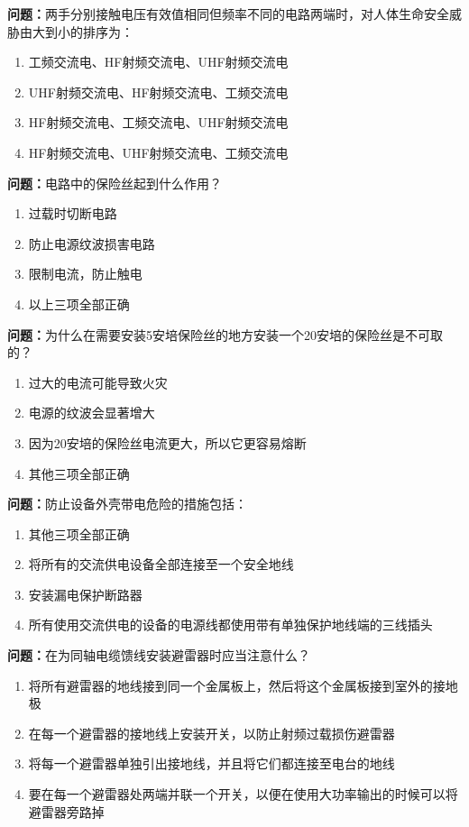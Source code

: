 \documentclass{ctexbook}
\begin{document}
\textbf{问题：}两手分别接触电压有效值相同但频率不同的电路两端时，对人体生命安全威胁由大到小的排序为：
\begin{enumerate}[label=\Alph*), leftmargin=3em]
\item 工频交流电、HF射频交流电、UHF射频交流电
\item UHF射频交流电、HF射频交流电、工频交流电
\item HF射频交流电、工频交流电、UHF射频交流电
\item HF射频交流电、UHF射频交流电、工频交流电
\end{enumerate}

\textbf{问题：}电路中的保险丝起到什么作用？
\begin{enumerate}[label=\Alph*), leftmargin=3em]
\item 过载时切断电路
\item 防止电源纹波损害电路
\item 限制电流，防止触电
\item 以上三项全部正确
\end{enumerate}

\textbf{问题：}为什么在需要安装5安培保险丝的地方安装一个20安培的保险丝是不可取的？
\begin{enumerate}[label=\Alph*), leftmargin=3em]
\item 过大的电流可能导致火灾
\item 电源的纹波会显著增大
\item 因为20安培的保险丝电流更大，所以它更容易熔断
\item 其他三项全部正确
\end{enumerate}

\textbf{问题：}防止设备外壳带电危险的措施包括：
\begin{enumerate}[label=\Alph*), leftmargin=3em]
\item 其他三项全部正确
\item 将所有的交流供电设备全部连接至一个安全地线
\item 安装漏电保护断路器
\item 所有使用交流供电的设备的电源线都使用带有单独保护地线端的三线插头
\end{enumerate}

\textbf{问题：}在为同轴电缆馈线安装避雷器时应当注意什么？
\begin{enumerate}[label=\Alph*), leftmargin=3em]
\item 将所有避雷器的地线接到同一个金属板上，然后将这个金属板接到室外的接地极
\item 在每一个避雷器的接地线上安装开关，以防止射频过载损伤避雷器
\item 将每一个避雷器单独引出接地线，并且将它们都连接至电台的地线
\item 要在每一个避雷器处两端并联一个开关，以便在使用大功率输出的时候可以将避雷器旁路掉
\end{enumerate}
\end{document}
